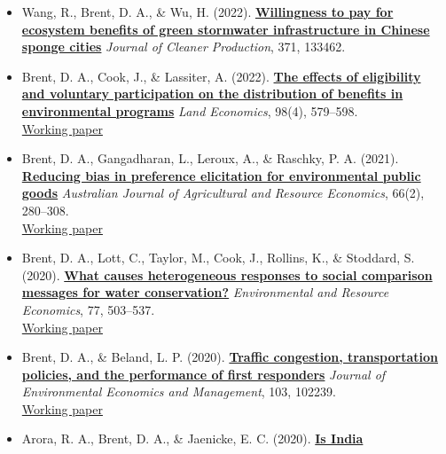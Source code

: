 \documentclass[
  11pt,
]{article}
\begin{document}
\begin{itemize}
  \textbf{\href{https://ascelibrary.org/doi/10.1061/JSWBAY.SWENG-513}{Identifying
  sweet spots for green stormwater infrastructure implementation: A case
  study in Lancaster, Pennsylvania}} \emph{Journal of Sustainable Water
  in the Built Environment}, 9(3).
\item
  Wang, R., Brent, D. A., \& Wu, H. (2022).
  \textbf{\href{https://www.sciencedirect.com/science/article/pii/S0959652622030438}{Willingness
  to pay for ecosystem benefits of green stormwater infrastructure in
  Chinese sponge cities}} \emph{Journal of Cleaner Production}, 371,
  133462.
\item
  Brent, D. A., Cook, J., \& Lassiter, A. (2022).
  \textbf{\href{https://le.uwpress.org/content/98/4/579.abstract}{The
  effects of eligibility and voluntary participation on the distribution
  of benefits in environmental programs}} \emph{Land Economics}, 98(4),
  579--598.\\
  \href{assets/papers/brent_cook_lassiter_equity_gsi_wp.pdf}{Working
  paper}
\item
  Brent, D. A., Gangadharan, L., Leroux, A., \& Raschky, P. A. (2021).
  \textbf{\href{https://onlinelibrary.wiley.com/doi/10.1111/1467-8489.12463}{Reducing
  bias in preference elicitation for environmental public goods}}
  \emph{Australian Journal of Agricultural and Resource Economics},
  66(2), 280--308.\\
  \href{assets/papers/brent_et_al_bias_wp.pdf}{Working paper}
\item
  Brent, D. A., Lott, C., Taylor, M., Cook, J., Rollins, K., \&
  Stoddard, S. (2020).
  \textbf{\href{https://link.springer.com/article/10.1007/s10640-020-00506-0}{What
  causes heterogeneous responses to social comparison messages for water
  conservation?}} \emph{Environmental and Resource Economics}, 77,
  503--537.\\
  \href{assets/papers/brent_et_al_het_social_comparison_wp.pdf}{Working
  paper}
\item
  Brent, D. A., \& Beland, L. P. (2020).
  \textbf{\href{https://www.sciencedirect.com/science/article/pii/S0095069620300620}{Traffic
  congestion, transportation policies, and the performance of first
  responders}} \emph{Journal of Environmental Economics and Management},
  103, 102239.\\
  \href{assets/papers/brent_beland_first_responders_wp.pdf}{Working
  paper}
\item
  Arora, R. A., Brent, D. A., \& Jaenicke, E. C. (2020).
  \textbf{\href{https://www.mdpi.com/2071-1050/12/11/4377}{Is India
}}
\end{itemize}
\end{document}
